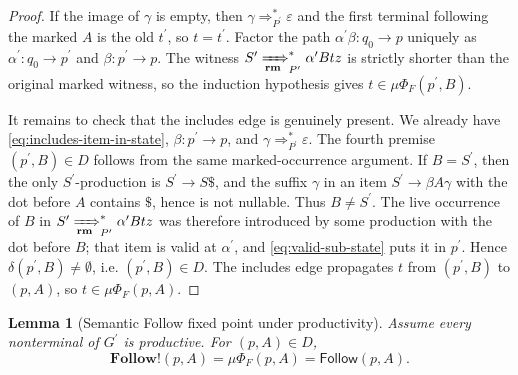 \documentclass[11pt,a4paper]{article}
\theoremstyle{prettyplain}
\newtheorem{lemma}[theorem]{Lemma}
\theoremstyle{prettydef}
\newcommand{\eps}{\varepsilon}
\newcommand{\RMP}{\xRightarrow[\mathbf{rm}]{}_{P^\prime}}
\newcommand{\Path}[3]{#1:#2\to#3}
\newcommand{\Follow}{\mathbf{Follow}}
\begin{document}
\begin{proof}
If the image of \(\gamma\) is empty, then
\(\gamma\Rightarrow_{P^\prime}^*\eps\) and the first terminal following the marked
\(A\) is the old \(t^\prime\), so \(t=t^\prime\).  Factor the path
\(\Path{\alpha^\prime\beta}{q_0}{p}\) uniquely as
\(\Path{\alpha^\prime}{q_0}{p^\prime}\) and
\(\Path{\beta}{p^\prime}{p}\).  The witness
\(S^\prime\RMP^*\alpha^\prime B t z\) is strictly shorter than the original
marked witness, so the induction hypothesis gives
\(t\in\mu\Phi_F(p^\prime,B)\).

It remains to check that the includes edge is genuinely present.  We already
have \eqref{eq:includes-item-in-state}, \(\Path{\beta}{p^\prime}{p}\), and
\(\gamma\Rightarrow_{P^\prime}^*\eps\).  The fourth premise
\((p^\prime,B)\in D\) follows from the same marked-occurrence argument.  If
\(B=S^\prime\), then the only \(S^\prime\)-production is
\(S^\prime\to S\$\), and the suffix \(\gamma\) in an item
\(S^\prime\to\beta A\gamma\) with the dot before \(A\) contains \(\$\), hence is
not nullable.  Thus \(B\ne S^\prime\).  The live occurrence of \(B\) in
\(S^\prime\RMP^*\alpha^\prime B t z\) was therefore introduced by some production
with the dot before \(B\); that item is valid at \(\alpha^\prime\), and
\eqref{eq:valid-sub-state} puts it in \(p^\prime\).  Hence
\(\delta(p^\prime,B)\ne\emptyset\), i.e. \((p^\prime,B)\in D\).  The includes edge
propagates \(t\) from \((p^\prime,B)\) to \((p,A)\), so
\(t\in\mu\Phi_F(p,A)\).
\end{proof}

\begin{lemma}[Semantic Follow fixed point under productivity]\label{lem:follow-fixed-point}
Assume every nonterminal of \(G^\prime\) is productive.  For \((p,A)\in D\),
\begin{equation}\label{eq:follow-eq}
\Follow\mathbin{!}(p,A)
=
\mu\Phi_F(p,A)
=
\mathsf{Follow}(p,A).
\end{equation}
\end{lemma}
\end{document}
